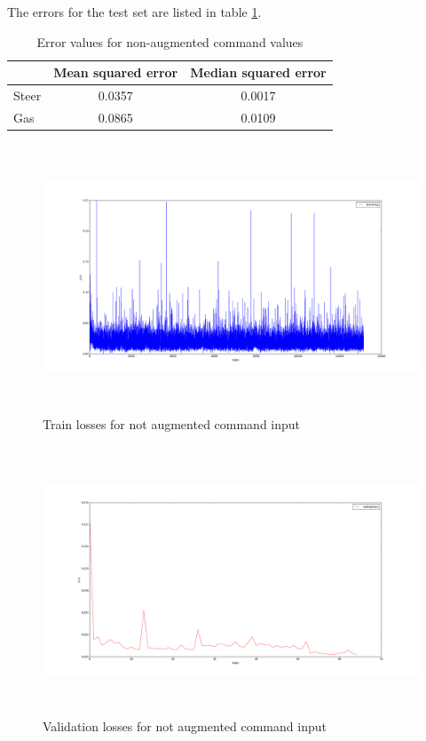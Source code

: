 \documentclass[a4paper]{article}
\begin{document}
  The errors for the test set are listed in table \ref{tab:error_command_non_aug}.
\begin{table}[H]
  \centering
  \caption{Error values for non-augmented command values}
  \begin{tabular}{lcc}
    &Mean squared error& Median squared error \\ \hline
    Steer & 0.0357 & 0.0017 \\
    Gas &0.0865&0.0109
  \end{tabular}
  \label{tab:error_command_non_aug}
\end{table}
  \begin{figure}[H]
    \centering
    \includegraphics[width=\textwidth, height=8cm]{../pics/command_input_nonaugmented_training.png}
    \caption{Train losses for not augmented command input}
    \label{fig:non_augmented_train_loss}
  \end{figure}

  \begin{figure}[H]
    \centering
    \includegraphics[width=\textwidth, height=8cm]{../pics/command_input_nonaugmented_validation.png}
    \caption{Validation losses for not augmented command input}
    \label{fig:non_augmented_val_loss}
  \end{figure}
\end{document}
